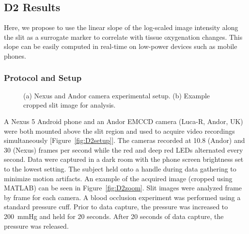 \subsection{D2 Results}
Here, we propose to use the linear slope of the log-scaled image intensity along the slit as a surrogate marker to correlate with tissue oxygenation changes. This slope can be easily computed in real-time on low-power devices such as mobile phones.
    
\subsubsection{Protocol and Setup}
\begin{figure}
    \begin{center}
    \end{center}
    \caption{(a) Nexus and Andor camera experimental setup. (b) Example cropped slit image for analysis.} 
    \label{fig:D2protocol}
\end{figure} 
A Nexus 5 Android phone and an Andor \ac{EMCCD} camera (Luca-R, Andor, UK) were both mounted above the slit region and used to acquire video recordings simultaneously [Figure~\ref{fig:D2setup}]. The cameras recorded at 10.8 (Andor) and 30 (Nexus) frames per second while the red and deep red \ac{LED}s alternated every second. Data were captured in a dark room with the phone screen brightness set to the lowest setting. The subject held onto a handle during data gathering to minimize motion artifacts. An example of the acquired image (cropped using MATLAB) can be seen in Figure~\ref{fig:D2zoom}. Slit images were analyzed frame by frame for each camera. A blood occlusion experiment was performed using a standard pressure cuff. Prior to data capture, the pressure was increased to 200~mmHg and held for 20 seconds. After 20 seconds of data capture, the pressure was released. 
        
